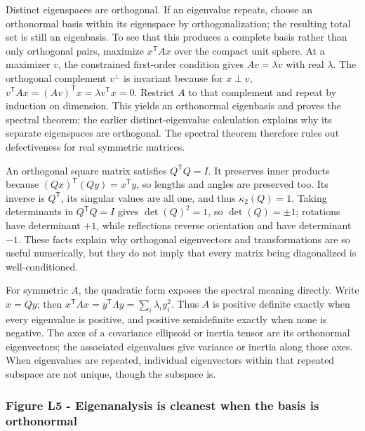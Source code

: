 Distinct eigenspaces are orthogonal. If an eigenvalue repeats, choose an orthonormal basis within its eigenspace by orthogonalization; the resulting total set is still an eigenbasis. To see that this produces a complete basis rather than only orthogonal pairs, maximize \(x^\mathsf TAx\) over the compact unit sphere. At a maximizer \(v\), the constrained first-order condition gives \(Av=\lambda v\) with real \(\lambda\). The orthogonal complement \(v^\perp\) is invariant because for \(x\perp v\), \(v^\mathsf TAx=(Av)^\mathsf Tx=\lambda v^\mathsf Tx=0\). Restrict \(A\) to that complement and repeat by induction on dimension. This yields an orthonormal eigenbasis and proves the spectral theorem; the earlier distinct-eigenvalue calculation explains why its separate eigenspaces are orthogonal. The spectral theorem therefore rules out defectiveness for real symmetric matrices.

An orthogonal square matrix satisfies \(Q^\mathsf TQ=I\). It preserves inner products because \((Qx)^\mathsf T(Qy)=x^\mathsf Ty\), so lengths and angles are preserved too. Its inverse is \(Q^\mathsf T\), its singular values are all one, and thus \(\kappa_2(Q)=1\). Taking determinants in \(Q^\mathsf TQ=I\) gives \(\det(Q)^2=1\), so \(\det(Q)=\pm1\); rotations have determinant \(+1\), while reflections reverse orientation and have determinant \(-1\). These facts explain why orthogonal eigenvectors and transformations are so useful numerically, but they do not imply that every matrix being diagonalized is well-conditioned.

For symmetric \(A\), the quadratic form exposes the spectral meaning directly. Write \(x=Qy\); then \(x^\mathsf TAx=y^\mathsf T\Lambda y=\sum_i\lambda_i y_i^2\). Thus \(A\) is positive definite exactly when every eigenvalue is positive, and positive semidefinite exactly when none is negative. The axes of a covariance ellipsoid or inertia tensor are its orthonormal eigenvectors; the associated eigenvalues give variance or inertia along those axes. When eigenvalues are repeated, individual eigenvectors within that repeated subspace are not unique, though the subspace is.

\subsubsection{Figure L5 - Eigenanalysis is cleanest when the basis is orthonormal}\label{01-foundations-i-ch020-figure-l5---eigenanalysis-is-cleanest-when-the-basis-is-orthonormal}

\hypertarget{01-foundations-i-ch020-figure-l5---eigenanalysis-is-cleanest-when-the-basis-is-orthonormal}{}

